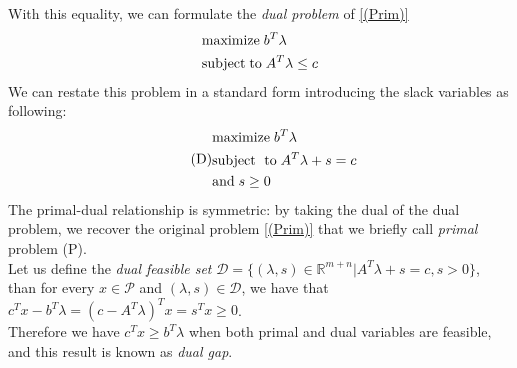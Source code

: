\documentclass[a4paper,10 pt,titlepage,twoside]{book}
\theoremstyle{plain}
\theoremstyle{definition}
\theoremstyle{remark}
\begin{document}
With this equality, we can formulate the \textit{dual problem} of \ref{(Prim)}
\begin{equation}\label{Dual}
\begin{split}
&\text{maximize\;} b^{T}\lambda\\
&\text{subject\;to\;}A^{T}\lambda \leq c
\end{split}
\end{equation} 
We can restate this problem in a standard form introducing the slack variables as following:
\begin{equation}\tag{D}
\begin{split}
&\text{maximize\;}b^{T}\lambda\\
&\text{subject\; to\;}A^{T}\lambda+s=c\\ &\text{and\;} s\geq0
\end{split}
\end{equation}
The primal-dual relationship is symmetric: by taking the dual of the dual problem, we recover the original problem \ref{(Prim)} that we briefly call \textit{primal} problem (P).\\
Let us define the \textit{dual feasible set} $\mathcal{D}=\{(\lambda,s)\in\mathbb{R}^{m+n}| A^{T}\lambda+s= c,s>0\}$, than for every $x\in\mathcal{P}$ and $\left(\lambda,s\right)\in\mathcal{D}$, we have that $c^{T}x-b^{T}\lambda=\left(c-A^{T}\lambda\right)^{T}x=s^{T}x \geq0$.\\
Therefore we have $c^{T}x\geq b^{T}\lambda$ when both primal and dual variables are feasible, and this result is known as \textit{dual gap}.\\
\end{document}

